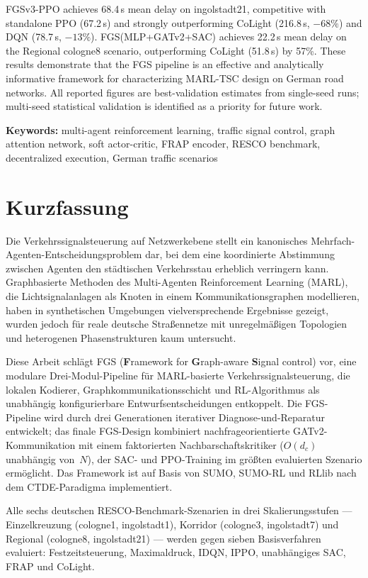 FGSv3-PPO achieves 68.4\,s mean delay on ingolstadt21, competitive with standalone PPO (67.2\,s) and strongly outperforming CoLight (216.8\,s, $-68\%$) and DQN (78.7\,s, $-13\%$). FGS(MLP+GATv2+SAC) achieves 22.2\,s mean delay on the Regional cologne8 scenario, outperforming CoLight (51.8\,s) by 57\%. These results demonstrate that the FGS pipeline is an effective and analytically informative framework for characterizing MARL-TSC design on German road networks. All reported figures are best-validation estimates from single-seed runs; multi-seed statistical validation is identified as a priority for future work.

\medskip
\noindent\textbf{Keywords:} multi-agent reinforcement learning, traffic signal control, graph attention network, soft actor-critic, FRAP encoder, RESCO benchmark, decentralized execution, German traffic scenarios

\chapter*{Kurzfassung}
\label{ch:Kurzfassung}

Die Verkehrssignalsteuerung auf Netzwerkebene stellt ein kanonisches Mehrfach-Agenten-Entscheidungsproblem dar, bei dem eine koordinierte Abstimmung zwischen Agenten den städtischen Verkehrsstau erheblich verringern kann. Graphbasierte Methoden des Multi-Agenten Reinforcement Learning (MARL), die Lichtsignalanlagen als Knoten in einem Kommunikationsgraphen modellieren, haben in synthetischen Umgebungen vielversprechende Ergebnisse gezeigt, wurden jedoch für reale deutsche Straßennetze mit unregelmäßigen Topologien und heterogenen Phasenstrukturen kaum untersucht.

Diese Arbeit schlägt FGS (\textbf{F}ramework for \textbf{G}raph-aware \textbf{S}ignal control) vor, eine modulare Drei-Modul-Pipeline für MARL-basierte Verkehrssignalsteuerung, die lokalen Kodierer, Graphkommunikationsschicht und RL-Algorithmus als unabhängig konfigurierbare Entwurfsentscheidungen entkoppelt. Die FGS-Pipeline wird durch drei Generationen iterativer Diagnose-und-Reparatur entwickelt; das finale FGS-Design kombiniert nachfrageorientierte GATv2-Kommunikation mit einem faktorierten Nachbarschaftskritiker ($O(d_c)$ unabhängig von~$N$), der SAC- und PPO-Training im größten evaluierten Szenario ermöglicht. Das Framework ist auf Basis von SUMO, SUMO-RL und RLlib nach dem CTDE-Paradigma implementiert.

Alle sechs deutschen RESCO-Benchmark-Szenarien in drei Skalierungsstufen — Einzelkreuzung (cologne1, ingolstadt1), Korridor (cologne3, ingolstadt7) und Regional (cologne8, ingolstadt21) — werden gegen sieben Basisverfahren evaluiert: Festzeitsteuerung, Maximaldruck, IDQN, IPPO, unabhängiges SAC, FRAP und CoLight.

